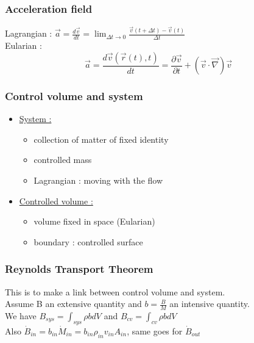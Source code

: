 \documentclass[../main.tex]{subfiles}
\begin{document}
\subsubsection{Acceleration field}
Lagrangian : $\Vec{a} = \frac{d\Vec{v}}{dt} = \lim_{\Delta t \rightarrow 0} \frac{\Vec{v}(t+\Delta t) - \Vec{v}(t)}{\Delta t}$\\

Eularian : \begin{equation}
    \Vec{a} = \frac{d\Vec{v}(\Vec{r}(t), t)}{dt} = \frac{\partial \Vec{v}}{\partial t} + (\Vec{v}\cdot \Vec{\nabla}) \Vec{v}
\end{equation}


\subsubsection{Control volume and system}
\begin{itemize}
    \item \underline{System :}\begin{itemize}
        \item collection of matter of fixed identity\\
        \item controlled mass\\
        \item Lagrangian : moving with the flow\\
    \end{itemize}
    \item \underline{Controlled volume :}\begin{itemize}
        \item volume fixed in space (Eularian)\\
        \item boundary : controlled surface\\
    \end{itemize}
\end{itemize}


\subsubsection{Reynolds Transport Theorem}
This is to make a link between control volume and system.\\

Assume B an extensive quantity and $b= \frac{B}{M}$ an intensive quantity.\\
We have $B_{sys} = \int_{sys} \rho b dV$ and $B_{cv} = \int_{cv} \rho b dV$\\
Also $\dot{B}_{in} = b_{in} \dot{M}_{in} = b_{in}\rho_{in}v_{in}A_{in}$, same goes for $\dot{B}_{out}$\\
\end{document}
